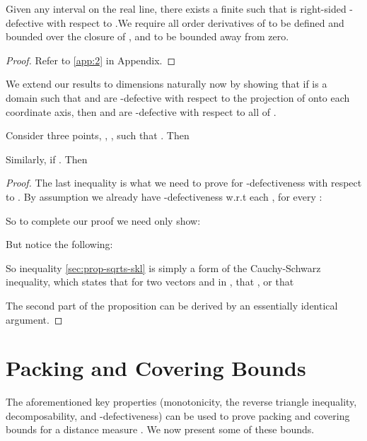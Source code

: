 \documentclass[11pt]{myclass}
\begin{document}
\begin{lemma}\label{Arootmubreg}
Given any interval  on the real line, there exists a finite  such that   is right-sided -defective with respect to .We require all order 
derivatives of  to be defined and bounded over the closure of , and  to be bounded away from zero. 
\end{lemma}

\begin{proof}
Refer to \ref{app:2} in Appendix.
\end{proof}

We extend our results to  dimensions naturally now by showing that if  is a domain such that  and  are -defective with respect to the projection of  onto each coordinate axis, then  and  are  -defective with respect to all of .  

\begin{lemma}\label{AallDmusim}
Consider three points, , ,  such that . Then 



Similarly, if . Then 



\end{lemma}

\begin{proof}

The last inequality is what we need to prove for -defectiveness with respect to  .
By assumption we already have -defectiveness w.r.t each , for every : 

So to complete our proof we need only show:

But notice the following:

So inequality \ref{sec:prop-sqrts-skl} is simply a form of the Cauchy-Schwarz inequality, which states that for two vectors  and  in , that , or that


The second part of the proposition can be derived by an essentially identical argument.
\end{proof}





\section{Packing and Covering Bounds}
\label{covering}
The aforementioned key properties (monotonicity, the reverse triangle inequality, decomposability, and -defectiveness) can be 
used to prove packing and covering bounds for a distance measure . We now present some of these bounds. 
\end{document}
